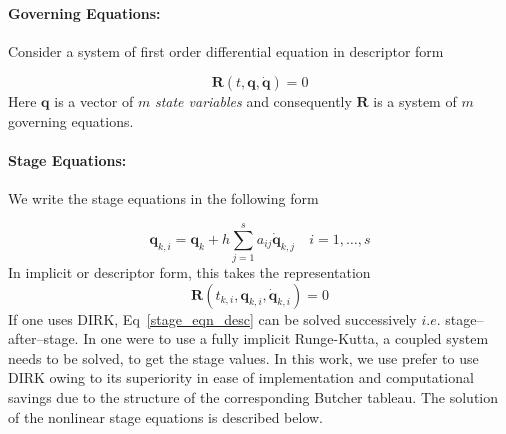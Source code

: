 \documentclass[pdftex,11pt,letter]{article}
\begin{document}
\begin{multicols}{2}
\paragraph{Governing Equations:}

Consider a system of first order differential equation in descriptor
form

\begin{equation}\label{first_order_eqn_desc}
  \mathbf{R}(t, \mathbf{q}, \mathbf{\dot{q}}) = 0
\end{equation}
Here $\mathbf{q}$ is a vector of $m$ \textit{state variables} and
consequently $\mathbf{R}$ is a system of $m$ governing equations.

\paragraph{Stage Equations:}

We write the stage equations in the following form

\begin{equation}\label{stage_eqn_first}
  \mathbf{q}_{k,i} = \mathbf{q}_{k} + h \sum_{j=1}^s a_{ij}
  \mathbf{\dot{q}}_{k,j} \quad i = 1,\ldots,s
\end{equation}
In implicit or descriptor form, this takes the representation
\begin{equation}\label{stage_eqn_desc}
  \mathbf{R}\left(t_{k,i}, \mathbf{q}_{k,i}, \mathbf{\dot{q}}_{k,i}\right) = 0
\end{equation}
If one uses DIRK, Eq~\ref{stage_eqn_desc} can be solved
successively $i.e.$ stage--after--stage. In one were to use a fully
implicit Runge-Kutta, a coupled system needs to be solved, to get the
stage values. In this work, we use prefer to use DIRK owing to its
superiority in ease of implementation and computational savings due to
the structure of the corresponding Butcher tableau. The solution of
the nonlinear stage equations is described below.


\end{multicols}
\end{document}
